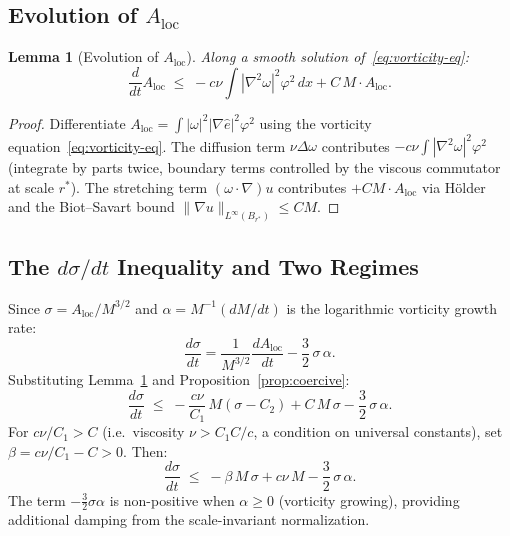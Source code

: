 \documentclass[11pt]{article}
\newtheorem{lemma}[theorem]{Lemma}
\theoremstyle{definition}
\theoremstyle{remark}
\begin{document}
\subsection{Evolution of \texorpdfstring{$A_{\mathrm{loc}}$}{A\_loc}}

\begin{lemma}[Evolution of $A_{\mathrm{loc}}$]\label{lem:A-evol}
  Along a smooth solution of~\eqref{eq:vorticity-eq}:
  \begin{equation}\label{eq:A-evol}
    \frac{d}{dt}A_{\mathrm{loc}} \;\leq\; -c\nu\int|\nabla^2\omega|^2\varphi^2\,dx
    + C\,M\cdot A_{\mathrm{loc}}.
  \end{equation}
\end{lemma}
\begin{proof}
  Differentiate $A_{\mathrm{loc}} = \int|\omega|^2|\nabla\hat{e}|^2\varphi^2$ using the
  vorticity equation~\eqref{eq:vorticity-eq}.  The diffusion term $\nu\Delta\omega$
  contributes $-c\nu\int|\nabla^2\omega|^2\varphi^2$ (integrate by parts twice,
  boundary terms controlled by the viscous commutator at scale $r^*$).
  The stretching term $(\omega\cdot\nabla)u$ contributes $+CM\cdot A_{\mathrm{loc}}$
  via Hölder and the Biot--Savart bound $\|\nabla u\|_{L^\infty(B_{r^*})}\leq CM$.
\end{proof}

\subsection{The \texorpdfstring{$d\sigma/dt$}{dsigma/dt} Inequality and Two Regimes}

Since $\sigma = A_{\mathrm{loc}}/M^{3/2}$ and $\alpha = M^{-1}(dM/dt)$ is the
logarithmic vorticity growth rate:
\[
  \frac{d\sigma}{dt} = \frac{1}{M^{3/2}}\frac{dA_{\mathrm{loc}}}{dt}
  - \frac{3}{2}\,\sigma\,\alpha.
\]
Substituting Lemma~\ref{lem:A-evol} and Proposition~\ref{prop:coercive}:
\begin{equation}\label{eq:dsigma-dt}
  \frac{d\sigma}{dt} \;\leq\; -\frac{c\nu}{C_1}\,M(\sigma - C_2)
  + C\,M\,\sigma - \frac{3}{2}\,\sigma\,\alpha.
\end{equation}
For $c\nu/C_1 > C$ (i.e.\ viscosity $\nu > C_1 C/c$, a condition on universal
constants), set $\beta = c\nu/C_1 - C > 0$.  Then:
\begin{equation}\label{eq:dsigma-clean}
  \frac{d\sigma}{dt} \;\leq\; -\beta\,M\,\sigma + c\nu\,M - \frac{3}{2}\,\sigma\,\alpha.
\end{equation}
The term $-\frac{3}{2}\sigma\alpha$ is non-positive when $\alpha\geq 0$ (vorticity
growing), providing additional damping from the scale-invariant normalization.
\end{document}
